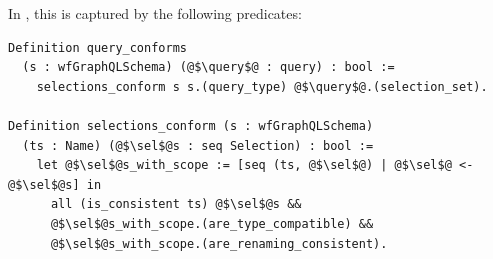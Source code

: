 \begin{figure}[h!]
{    %
    }
    \label{fig:semantics}
\end{figure}


\noindent In \gcoql, this is captured by the following predicates:
\begin{verbatim}
Definition query_conforms 
  (s : wfGraphQLSchema) (@$\query$@ : query) : bool :=
    selections_conform s s.(query_type) @$\query$@.(selection_set).
    
Definition selections_conform (s : wfGraphQLSchema)
  (ts : Name) (@$\sel$@s : seq Selection) : bool :=
    let @$\sel$@s_with_scope := [seq (ts, @$\sel$@) | @$\sel$@ <- @$\sel$@s] in 
      all (is_consistent ts) @$\sel$@s &&
      @$\sel$@s_with_scope.(are_type_compatible) &&
      @$\sel$@s_with_scope.(are_renaming_consistent).
\end{verbatim}

